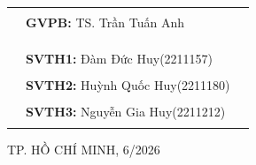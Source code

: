 \documentclass[12pt, a4paper]{report}
\theoremstyle{definition}
\begin{document}
\begin{titlepage}
\begin{table}[h]
\begin{tabular}{rll}
\\
\\
\hspace{6 cm} &   \textbf{\large GVPB:} {\large TS. Trần Tuấn Anh}
\\
\\
\\
\\
\hspace{6 cm} &   \textbf{\large SVTH1:} {\large Đàm Đức Huy(2211157)}
\\
\\
\hspace{6 cm}&   \textbf{\large SVTH2:}  {\large Huỳnh Quốc Huy(2211180)}
\\
\\
\hspace{6 cm} &   \textbf{\large SVTH3:}  {\large Nguyễn Gia Huy(2211212)}
\\
\\
\end{tabular}
\end{table}
\vspace{0.5cm}
\begin{center}
{\large TP. HỒ CHÍ MINH, 6/2026 }
\end{center}
\end{titlepage}
\newpage

% 
\newpage





\newpage
\tableofcontents
\newpage
\listoffigures
\newpage
\listoftables
\newpage
\setcounter{page}{1}


\newpage

\newpage

\newpage

\newpage


\end{document}

